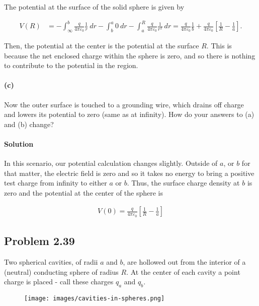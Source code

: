 \documentclass{article}
\begin{document}
The potential at the surface of the solid sphere is given by 

\begin{align*}
    V(R) &= -\int_{\infty}^b \frac{q}{4\pi\varepsilon_0}\frac{1}{r}\ dr - \int_b^a 0 \ dr - \int_a^R \frac{q}{4\pi \varepsilon_0}\frac{1}{r^2}\ dr = \frac{q}{4\pi \varepsilon_0}\frac{1}{b} + \frac{q}{4\pi \varepsilon_0}\left[ \frac{1}{R} - \frac{1}{a}\right].
\end{align*}

Then, the potential at the center is the potential at the surface $R$. This is because the net enclosed charge within the sphere is zero, and so there is nothing to contribute to the potential in the region.

\paragraph{(c)} Now the outer surface is touched to a grounding wire, which drains off charge and lowers its potential to zero (same as at infinity). How do your answers to (a) and (b) change?

\paragraph{Solution} In this scenario, our potential calculation changes slightly. Outside of $a$, or $b$ for that matter, the electric field is zero and so it takes no energy to bring a positive test charge from infinity to either $a$ or $b$. Thus, the surface charge density at $b$ is zero and the potential at the center of the sphere is 

\begin{align*}
    V(0) = \frac{q}{4\pi \varepsilon_0}\left[ \frac{1}{R} - \frac{1}{a}\right]
\end{align*}

\newpage

\subsection*{Problem 2.39}
Two spherical cavities, of radii $a$ and $b$, are hollowed out from the interior of a (neutral) conducting sphere of radius $R$. At the center of each cavity a point charge is placed - call these charges $q_a$ and $q_b$.

\begin{figure}[h]
    \centering
    \texttt{[image: images/cavities-in-spheres.png]}
\end{figure}
\end{document}
